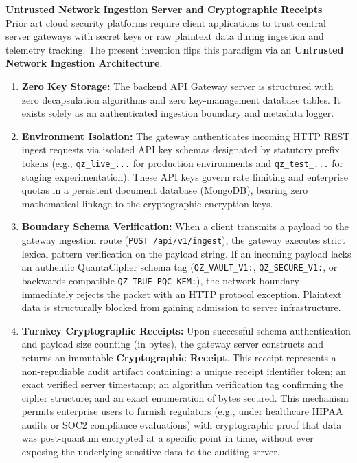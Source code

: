 \documentclass[12pt, a4paper]{article}
\begin{document}
\vspace{0.5em}
\noindent \textbf{Untrusted Network Ingestion Server and Cryptographic Receipts} \\
Prior art cloud security platforms require client applications to trust central server gateways with secret keys or raw plaintext data during ingestion and telemetry tracking. The present invention flips this paradigm via an \textbf{Untrusted Network Ingestion Architecture}:
\begin{enumerate}
    \item \textbf{Zero Key Storage:} The backend API Gateway server is structured with zero decapsulation algorithms and zero key-management database tables. It exists solely as an authenticated ingestion boundary and metadata logger.
    \item \textbf{Environment Isolation:} The gateway authenticates incoming HTTP REST ingest requests via isolated API key schemas designated by statutory prefix tokens (e.g., \texttt{qz\_live\_...} for production environments and \texttt{qz\_test\_...} for staging experimentation). These API keys govern rate limiting and enterprise quotas in a persistent document database (MongoDB), bearing zero mathematical linkage to the cryptographic encryption keys.
    \item \textbf{Boundary Schema Verification:} When a client transmits a payload to the gateway ingestion route (\texttt{POST /api/v1/ingest}), the gateway executes strict lexical pattern verification on the payload string. If an incoming payload lacks an authentic QuantaCipher schema tag (\texttt{QZ\_VAULT\_V1:}, \texttt{QZ\_SECURE\_V1:}, or backwards-compatible \texttt{QZ\_TRUE\_PQC\_KEM:}), the network boundary immediately rejects the packet with an HTTP protocol exception. Plaintext data is structurally blocked from gaining admission to server infrastructure.
    \item \textbf{Turnkey Cryptographic Receipts:} Upon successful schema authentication and payload size counting (in bytes), the gateway server constructs and returns an immutable \textbf{Cryptographic Receipt}. This receipt represents a non-repudiable audit artifact containing: a unique receipt identifier token; an exact verified server timestamp; an algorithm verification tag confirming the cipher structure; and an exact enumeration of bytes secured. This mechanism permits enterprise users to furnish regulators (e.g., under healthcare HIPAA audits or SOC2 compliance evaluations) with cryptographic proof that data was post-quantum encrypted at a specific point in time, without ever exposing the underlying sensitive data to the auditing server.
\end{enumerate}
\end{document}
